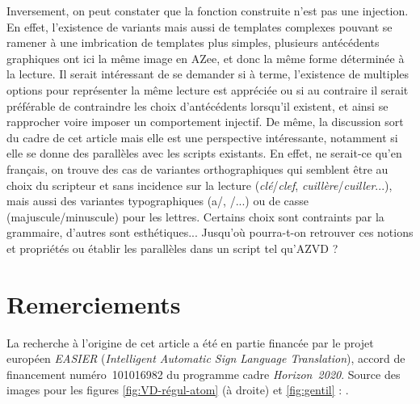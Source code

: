 \documentclass[french,utf8x]{article}
\begin{document}
Inversement, on peut constater que la fonction construite n'est pas une injection.
En effet, l'existence de variants mais aussi de templates complexes pouvant se ramener à une imbrication de templates plus simples, plusieurs antécédents graphiques ont ici la même image en AZee, et donc la même forme déterminée à la lecture.
Il serait intéressant de se demander si à terme, l'existence de multiples options pour représenter la même lecture est appréciée ou si au contraire il serait préférable de contraindre les choix d'antécédents lorsqu'il existent, et ainsi se rapprocher voire imposer un comportement injectif.
De même, la discussion sort du cadre de cet article mais elle est une perspective intéressante, notamment si elle se donne des parallèles avec les scripts existants.
En effet, ne serait-ce qu'en français, on trouve des cas de variantes orthographiques qui semblent être au choix du scripteur et sans incidence sur la lecture (\emph{clé}/\emph{clef}, \emph{cuillère}/\emph{cuiller}...), mais aussi des variantes typographiques (a/\textscripta, \textg/\textscriptg...) ou de casse (majuscule/minuscule) pour les lettres.
Certains choix sont contraints par la grammaire, d'autres sont esthétiques...
Jusqu'où pourra-t-on retrouver ces notions et propriétés ou établir les parallèles dans un script tel qu'AZVD ?


\section*{Remerciements}
La recherche à l'origine de cet article a été en partie financée par le projet européen \emph{EASIER} (\emph{Intelligent Automatic Sign Language Translation}), accord de financement numéro~101016982 du programme cadre \emph{Horizon~2020}. Source des images pour les figures \ref{fig:VD-régul-atom} (à droite) et \ref{fig:gentil} : \cite{IVT-dico-1997}.




\end{document}
